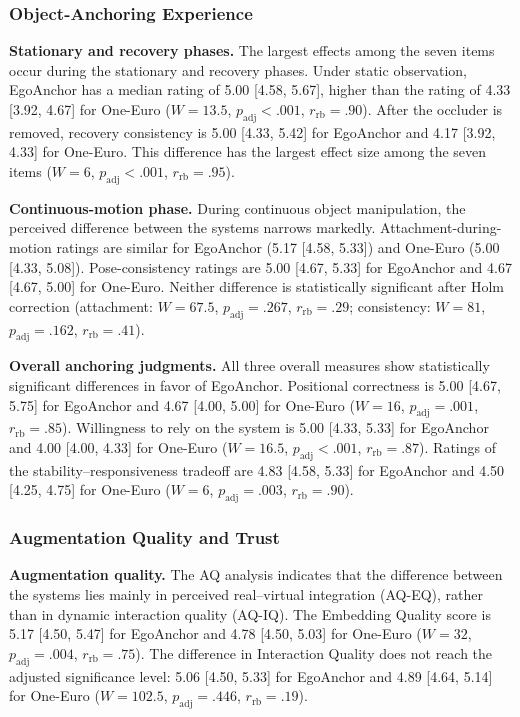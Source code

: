 \documentclass[review]{vgtc}
\begin{document}
\subsubsection{Object-Anchoring Experience}

\textbf{Stationary and recovery phases.}
The largest effects among the seven items occur during the stationary and recovery phases. Under static observation, EgoAnchor has a median rating of 5.00 [4.58, 5.67], higher than the rating of 4.33 [3.92, 4.67] for One-Euro ($W=13.5$, $p_{\mathrm{adj}}<.001$, $r_{\mathrm{rb}}=.90$). After the occluder is removed, recovery consistency is 5.00 [4.33, 5.42] for EgoAnchor and 4.17 [3.92, 4.33] for One-Euro. This difference has the largest effect size among the seven items ($W=6$, $p_{\mathrm{adj}}<.001$, $r_{\mathrm{rb}}=.95$).

\textbf{Continuous-motion phase.}
During continuous object manipulation, the perceived difference between the systems narrows markedly. Attachment-during-motion ratings are similar for EgoAnchor (5.17 [4.58, 5.33]) and One-Euro (5.00 [4.33, 5.08]). Pose-consistency ratings are 5.00 [4.67, 5.33] for EgoAnchor and 4.67 [4.67, 5.00] for One-Euro. Neither difference is statistically significant after Holm correction (attachment: $W=67.5$, $p_{\mathrm{adj}}=.267$, $r_{\mathrm{rb}}=.29$; consistency: $W=81$, $p_{\mathrm{adj}}=.162$, $r_{\mathrm{rb}}=.41$).

\textbf{Overall anchoring judgments.}
All three overall measures show statistically significant differences in favor of EgoAnchor. Positional correctness is 5.00 [4.67, 5.75] for EgoAnchor and 4.67 [4.00, 5.00] for One-Euro ($W=16$, $p_{\mathrm{adj}}=.001$, $r_{\mathrm{rb}}=.85$). Willingness to rely on the system is 5.00 [4.33, 5.33] for EgoAnchor and 4.00 [4.00, 4.33] for One-Euro ($W=16.5$, $p_{\mathrm{adj}}<.001$, $r_{\mathrm{rb}}=.87$). Ratings of the stability--responsiveness tradeoff are 4.83 [4.58, 5.33] for EgoAnchor and 4.50 [4.25, 4.75] for One-Euro ($W=6$, $p_{\mathrm{adj}}=.003$, $r_{\mathrm{rb}}=.90$).

\subsubsection{Augmentation Quality and Trust}

\textbf{Augmentation quality.}
The AQ analysis indicates that the difference between the systems lies mainly in perceived real--virtual integration (AQ-EQ), rather than in dynamic interaction quality (AQ-IQ). The Embedding Quality score is 5.17 [4.50, 5.47] for EgoAnchor and 4.78 [4.50, 5.03] for One-Euro ($W=32$, $p_{\mathrm{adj}}=.004$, $r_{\mathrm{rb}}=.75$). The difference in Interaction Quality does not reach the adjusted significance level: 5.06 [4.50, 5.33] for EgoAnchor and 4.89 [4.64, 5.14] for One-Euro ($W=102.5$, $p_{\mathrm{adj}}=.446$, $r_{\mathrm{rb}}=.19$).
\end{document}
